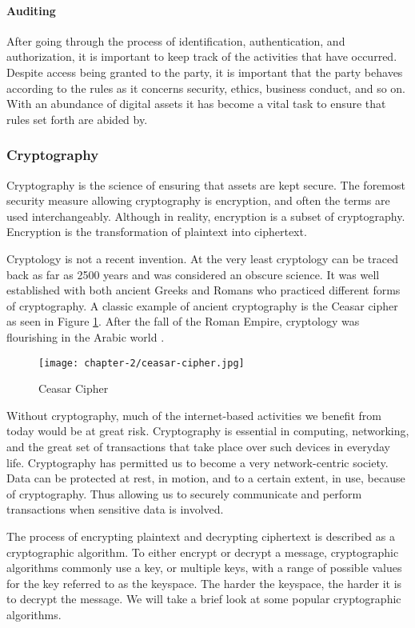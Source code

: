 \paragraph{Auditing}
After going through the process of identification, authentication, and authorization, it is important to keep track of the activities that have occurred. Despite access being granted to the party, it is important that the party behaves according to the rules as it concerns security, ethics, business conduct, and so on. With an abundance of digital assets it has become a vital task to ensure that rules set forth are abided by.

\subsubsection{Cryptography}
Cryptography is the science of ensuring that assets are kept secure. The foremost security measure allowing cryptography is encryption, and often the terms are used interchangeably. Although in reality, encryption is a subset of cryptography. Encryption is the transformation of plaintext into ciphertext. 

Cryptology is not a recent invention. At the very least cryptology can be traced back as far as 2500 years and was considered an obscure science. It was well established with both ancient Greeks and Romans who practiced different forms of cryptography. A classic example of ancient cryptography is the Ceasar cipher as seen in Figure \ref{fig:ceasar-cipher}. After the fall of the Roman Empire, cryptology was flourishing in the Arabic world \cite{dooley2018history}.

\begin{figure}
    \texttt{[image: chapter-2/ceasar-cipher.jpg]}
    \caption{Ceasar Cipher}\label{fig:ceasar-cipher}
\end{figure}

Without cryptography, much of the internet-based activities we benefit from today would be at great risk. Cryptography is essential in computing, networking, and the great set of transactions that take place over such devices in everyday life. Cryptography has permitted us to become a very network-centric society. 
Data can be protected at rest, in motion, and to a certain extent, in use, because of cryptography. Thus allowing us to securely communicate and perform transactions when sensitive data is involved.

The process of encrypting plaintext and decrypting ciphertext is described as a cryptographic algorithm. To either encrypt or decrypt a message, cryptographic algorithms commonly use a key, or multiple keys, with a range of possible values for the key referred to as the keyspace. The harder the keyspace, the harder it is to decrypt the message. We will take a brief look at some popular cryptographic algorithms.

